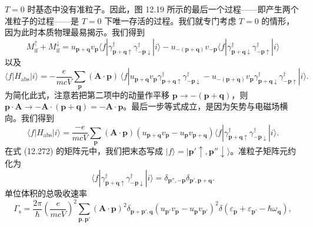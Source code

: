 $T=0$ 时基态中没有准粒子。因此，图 12.19 所示的最后一个过程——即产生两个准粒子的过程——是 $T=0$ 下唯一存活的过程。我们就专门考虑 $T=0$ 的情形，因为此时本质物理最易揭示。我们得到
\begin{equation*}
M_{\mathrm{if}}^{\uparrow}+M_{\mathrm{if}}^{\downarrow}=u_{\mathbf{p}+\mathbf{q}}v_{\mathbf{p}}\langle f|\gamma_{\mathbf{p}+\mathbf{q}\uparrow}^{\dagger}\gamma_{-\mathbf{p}\downarrow}^{\dagger}|i\rangle-u_{-(\mathbf{p}+\mathbf{q})}v_{-\mathbf{p}}\langle f|\gamma_{\mathbf{p}+\mathbf{q}\downarrow}^{\dagger}\gamma_{-\mathbf{p}\uparrow}^{\dagger}|i\rangle\tag{12.270}
\end{equation*}
以及
\begin{equation*}
\langle f|H_{\mathrm{abs}}|i\rangle=-\frac{e}{mcV}\sum_{\mathbf{p}}(\mathbf{A}\cdot\mathbf{p})\,\langle f|u_{\mathbf{p}+\mathbf{q}}v_{\mathbf{p}}\gamma_{\mathbf{p}+\mathbf{q}\uparrow}^{\dagger}\gamma_{-\mathbf{p}\downarrow}^{\dagger}-u_{-(\mathbf{p}+\mathbf{q})}v_{\mathbf{p}}\gamma_{\mathbf{p}+\mathbf{q}\downarrow}^{\dagger}\gamma_{-\mathbf{p}\uparrow}^{\dagger}|i\rangle.\tag{12.271}
\end{equation*}
为简化此式，注意若把第二项中的动量作平移 $\mathbf{p}\to-(\mathbf{p}+\mathbf{q})$，则 $\mathbf{p}\cdot\mathbf{A}\to-\mathbf{A}\cdot(\mathbf{p}+\mathbf{q})=-\mathbf{A}\cdot\mathbf{p}$。最后一步等式成立，是因为矢势与电磁场横向。我们得到
\begin{equation*}
\langle f|H_{\mathrm{abs}}|i\rangle=\frac{-e}{mcV}\sum_{\mathbf{p}}(\mathbf{A}\cdot\mathbf{p})\left(u_{\mathbf{p}+\mathbf{q}}v_{\mathbf{p}}-u_{\mathbf{p}}v_{\mathbf{p}+\mathbf{q}}\right)\langle f|\gamma_{\mathbf{p}+\mathbf{q}\uparrow}^{\dagger}\gamma_{-\mathbf{p}\downarrow}^{\dagger}|i\rangle.\tag{12.272}
\end{equation*}
在式 (12.272) 的矩阵元中，我们把末态写成 $|f\rangle=|\mathbf{p}'\uparrow,\mathbf{p}''\downarrow\rangle$。准粒子矩阵元约化为
\begin{equation*}
\langle f|\gamma_{\mathbf{p}+\mathbf{q}\uparrow}^{\dagger}\gamma_{-\mathbf{p}\downarrow}^{\dagger}|i\rangle=\delta_{\mathbf{p}'',-\mathbf{p}}\delta_{\mathbf{p}',\mathbf{p}+\mathbf{q}}.\tag{12.273}
\end{equation*}
单位体积的总吸收速率
\begin{equation*}
\Gamma_{\mathrm{s}}=\frac{2\pi}{\hbar}\left(\frac{e}{mcV}\right)^{2}\sum_{\mathbf{p},\mathbf{p}'}(\mathbf{A}\cdot\mathbf{p})^{2}\delta_{\mathbf{p}+\mathbf{p}',\mathbf{q}}\left(u_{\mathbf{p}'}v_{\mathbf{p}}-u_{\mathbf{p}}v_{\mathbf{p}'}\right)^{2}\delta\left(\varepsilon_{\mathbf{p}}+\varepsilon_{\mathbf{p}'}-\hbar\omega_{\mathbf{q}}\right),\tag{12.274}
\end{equation*}
